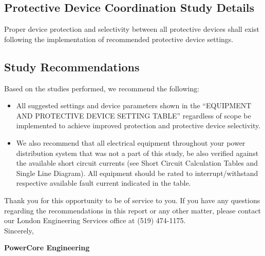 \subsection{Protective Device Coordination Study Details}
\label{af:results:pdcd}

Proper device protection and selectivity between all protective devices shall exist following the implementation of recommended protective device settings.

\pagebreak

\subsection{Study Recommendations}
\label{af:results:afsr}

Based on the studies performed, we recommend the following:
\begin{itemize}
	\item All suggested settings and device parameters shown in the “EQUIPMENT AND PROTECTIVE DEVICE SETTING TABLE” regardless of scope be implemented to achieve improved protection and protective device selectivity.
	\item We also recommend that all electrical equipment throughout your power distribution system that was not a part of this study, be also verified against the available short circuit currents (see Short Circuit Calculation Tables and Single Line Diagram). All equipment should be rated to interrupt/withstand respective
available fault current indicated in the table.
\end{itemize}

\vspace{10mm}
\noindent Thank you for this opportunity to be of service to you.  If you have any questions regarding the recommendations in this report or any other matter, please contact our London Engineering Services office at (519) 474-1175. \newline
\vspace{5mm}
\\
\noindent Sincerely,\newline

\vspace{5mm}
\noindent\textbf{PowerCore Engineering}\newline

